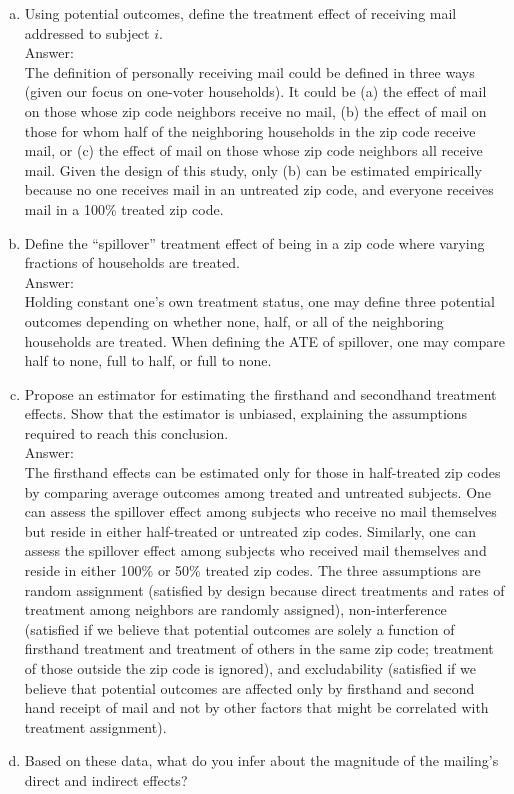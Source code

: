 \documentclass[11pt,notitlepage]{article}\usepackage[]{graphicx}\usepackage[]{color}
\begin{document}
\begin{enumerate}[a)]
\item Using potential outcomes, define the treatment effect of receiving mail addressed to subject $i$.\\
Answer:\\
The definition of personally receiving mail could be defined in three ways (given our focus on one-voter households). It could be (a) the effect of mail on those whose zip code neighbors receive no mail, (b) the effect of mail on those for whom half of the neighboring households in the zip code receive mail, or (c) the effect of mail on those whose zip code neighbors all receive mail. Given the design of this study, only (b) can be estimated empirically because no one receives mail in an untreated zip code, and everyone receives mail in a 100\% treated zip code.

\item Define the ``spillover'' treatment effect of being in a zip code where varying fractions of households are treated.\\
Answer:\\
Holding constant one's own treatment status, one may define three potential outcomes depending on whether none, half, or all of the neighboring households are treated.  When defining the ATE of spillover, one may compare half to none, full to half, or full to none.
\item Propose an estimator for estimating the firsthand and secondhand treatment effects. Show that the estimator is unbiased, explaining the assumptions required to reach this conclusion. \\
Answer:\\
The firsthand effects can be estimated only for those in half-treated zip codes by comparing average outcomes among treated and untreated subjects. One can assess the spillover effect among subjects who receive no mail themselves but reside in either half-treated or untreated zip codes. Similarly, one can assess the spillover effect among subjects who received mail themselves and reside in either 100\% or 50\% treated zip codes. The three assumptions are random assignment (satisfied by design because direct treatments and rates of treatment among neighbors are randomly assigned), non-interference (satisfied if we believe that potential outcomes are solely a function of firsthand treatment and treatment of others in the same zip code; treatment of those outside the zip code is ignored), and excludability (satisfied if we believe that potential outcomes are affected only by firsthand and second hand receipt of mail and not by other factors that might be correlated with treatment assignment).
\item Based on these data, what do you infer about the magnitude of the mailing's direct and indirect effects?\\


\end{enumerate}
\end{document}
